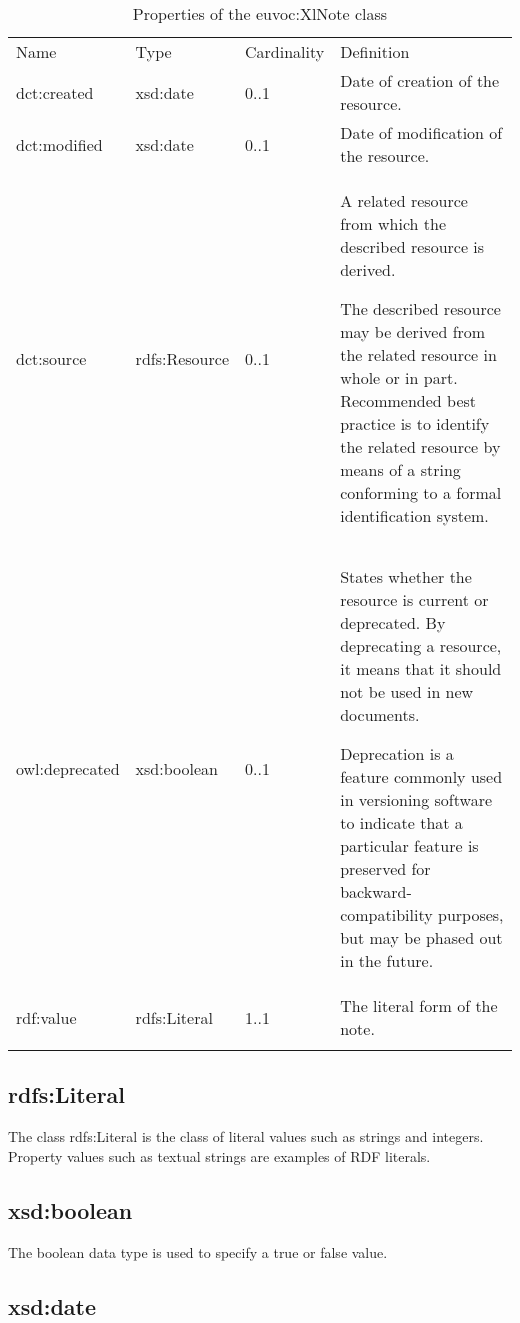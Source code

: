 {
	\footnotesize
	\selectfont%
	\begin{longtable}[c]{@{}p{3cm}p{2cm}p{2cm}p{7.8cm}@{}}
		\toprule\addlinespace
		Name & Type & Cardinality & Definition
		\\\addlinespace
		\midrule\endhead
		dct:created & xsd:date & 0..1 & Date of creation of the resource.
		\\\addlinespace
		dct:modified & xsd:date & 0..1 & Date of modification of the resource.
		\\\addlinespace
		dct:source & rdfs:Resource & 0..1 & A related resource from which the
		described resource is derived.
		
		The described resource may be derived from the related resource in whole
		or in part. Recommended best practice is to identify the related
		resource by means of a string conforming to a formal identification
		system.
		\\\addlinespace
		owl:deprecated & xsd:boolean & 0..1 & States whether the resource is
		current or deprecated. By deprecating a resource, it means that it
		should not be used in new documents.
		
		Deprecation is a feature commonly used in versioning software to
		indicate that a particular feature is preserved for
		backward-compatibility purposes, but may be phased out in the future.
		\\\addlinespace
		rdf:value & rdfs:Literal & 1..1 & The literal form of the note.
		\\\addlinespace
		\bottomrule
		\addlinespace
		\caption{Properties of the euvoc:XlNote class}
	\end{longtable}
}


\subsection{rdfs:Literal}

The class rdfs:Literal is the class of literal values such as strings
and integers. Property values such as textual strings are examples of
RDF literals.

\subsection{xsd:boolean}

The boolean data type is used to specify a true or false value.

\subsection{xsd:date}


